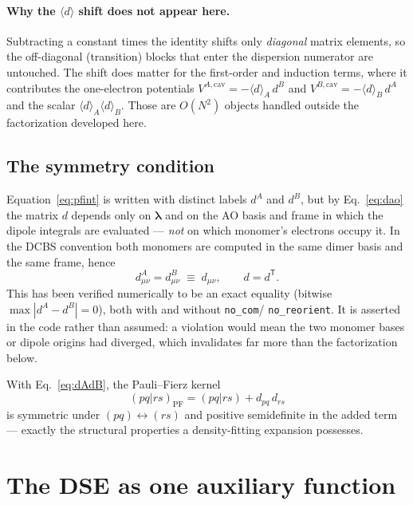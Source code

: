 \documentclass[11pt]{article}
\newcommand{\lam}{\bm{\lambda}}
\newcommand{\dexp}{\langle d \rangle}
\begin{document}
\paragraph{Why the $\dexp$ shift does not appear here.} Subtracting a constant
times the identity shifts only \emph{diagonal} matrix elements, so the
off-diagonal (transition) blocks that enter the dispersion numerator are
untouched. The shift does matter for the first-order and induction terms, where
it contributes the one-electron potentials
$V^{A,\mathrm{cav}} = -\dexp_A\, d^{B}$ and
$V^{B,\mathrm{cav}} = -\dexp_B\, d^{A}$ and the scalar $\dexp_A \dexp_B$.
Those are $O(N^2)$ objects handled outside the factorization developed here.

\subsection{The symmetry condition}
\label{sec:symmetry}

Equation~\eqref{eq:pfint} is written with distinct labels $d^A$ and $d^B$, but
by Eq.~\eqref{eq:dao} the matrix $d$ depends only on $\lam$ and on the AO
basis and frame in which the dipole integrals are evaluated --- \emph{not} on
which monomer's electrons occupy it. In the DCBS convention both monomers are
computed in the same dimer basis and the same frame, hence
\begin{equation}
d^{A}_{\mu\nu} = d^{B}_{\mu\nu} \;\equiv\; d_{\mu\nu} ,
\qquad d = d^{\mathsf T} .
\label{eq:dAdB}
\end{equation}
This has been verified numerically to be an exact equality (bitwise
$\max|d^A - d^B| = 0$), both with and without \texttt{no\_com}/%
\texttt{no\_reorient}. It is asserted in the code rather than assumed: a
violation would mean the two monomer bases or dipole origins had diverged,
which invalidates far more than the factorization below.

With Eq.~\eqref{eq:dAdB}, the Pauli--Fierz kernel
\begin{equation}
(pq|rs)_{\mathrm{PF}} = (pq|rs) + d_{pq}\, d_{rs}
\label{eq:pfsym}
\end{equation}
is symmetric under $(pq)\leftrightarrow(rs)$ and positive semidefinite in the
added term --- exactly the structural properties a density-fitting expansion
possesses.

\section{The DSE as one auxiliary function}
\label{sec:onerow}
\end{document}
